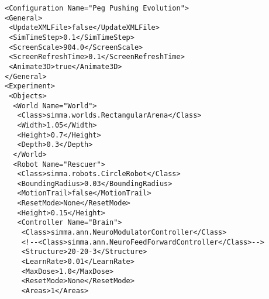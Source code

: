 \documentclass[12pt,fleqn,a4paper]{article}
\begin{document}
\lstset{language=XML}
\begin{lstlisting}
<Configuration Name="Peg Pushing Evolution">
<General>
 <UpdateXMLFile>false</UpdateXMLFile>
 <SimTimeStep>0.1</SimTimeStep>
 <ScreenScale>904.0</ScreenScale>
 <ScreenRefreshTime>0.1</ScreenRefreshTime>
 <Animate3D>true</Animate3D>
</General>
<Experiment>
 <Objects>
  <World Name="World">
   <Class>simma.worlds.RectangularArena</Class>
   <Width>1.05</Width>
   <Height>0.7</Height>
   <Depth>0.3</Depth>
  </World>
  <Robot Name="Rescuer">
   <Class>simma.robots.CircleRobot</Class>
   <BoundingRadius>0.03</BoundingRadius>
   <MotionTrail>false</MotionTrail>
   <ResetMode>None</ResetMode>
   <Height>0.15</Height>
   <Controller Name="Brain">
    <Class>simma.ann.NeuroModulatorController</Class>
    <!--<Class>simma.ann.NeuroFeedForwardController</Class>-->
    <Structure>20-20-3</Structure>
    <LearnRate>0.01</LearnRate>
    <MaxDose>1.0</MaxDose>
    <ResetMode>None</ResetMode>
    <Areas>1</Areas>
   

\end{lstlisting}
\end{document}
